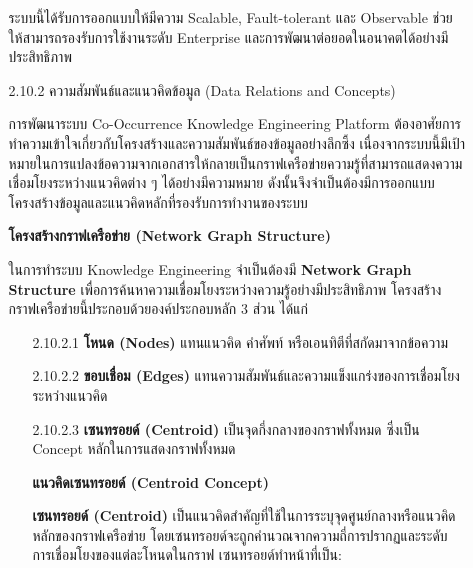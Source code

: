 \documentclass[12pt,a4paper]{article}
\newcommand{\textlight}[1]{{\thailightfont #1}}
\begin{document}
\begin{enumerate}[leftmargin=2cm]
\begin{enumerate}
{            \hspace{1cm}ระบบนี้ได้รับการออกแบบให้มีความ Scalable, Fault-tolerant และ Observable ช่วยให้สามารถรองรับการใช้งานระดับ Enterprise และการพัฒนาต่อยอดในอนาคตได้อย่างมีประสิทธิภาพ
        }

        \item[2.10.2] ความสัมพันธ์และแนวคิดข้อมูล (Data Relations and Concepts)
        \\
        \textlight{
            \hspace{1cm}การพัฒนาระบบ Co-Occurrence Knowledge Engineering Platform ต้องอาศัยการทำความเข้าใจเกี่ยวกับโครงสร้างและความสัมพันธ์ของข้อมูลอย่างลึกซึ้ง เนื่องจากระบบนี้มีเป้าหมายในการแปลงข้อความจากเอกสารให้กลายเป็นกราฟเครือข่ายความรู้ที่สามารถแสดงความเชื่อมโยงระหว่างแนวคิดต่าง ๆ ได้อย่างมีความหมาย ดังนั้นจึงจำเป็นต้องมีการออกแบบโครงสร้างข้อมูลและแนวคิดหลักที่รองรับการทำงานของระบบ

            \vspace{0.5cm}

            \textbf{โครงสร้างกราฟเครือข่าย (Network Graph Structure)}

            \hspace{1cm}ในการทำระบบ Knowledge Engineering จำเป็นต้องมี \textbf{Network Graph Structure} เพื่อการค้นหาความเชื่อมโยงระหว่างความรู้อย่างมีประสิทธิภาพ โครงสร้างกราฟเครือข่ายนี้ประกอบด้วยองค์ประกอบหลัก 3 ส่วน ได้แก่

            \begin{enumerate}
                \item[2.10.2.1] \textbf{โหนด (Nodes)} แทนแนวคิด คำศัพท์ หรือเอนทิตีที่สกัดมาจากข้อความ
                \item[2.10.2.2] \textbf{ขอบเชื่อม (Edges)} แทนความสัมพันธ์และความแข็งแกร่งของการเชื่อมโยงระหว่างแนวคิด
                \item[2.10.2.3] \textbf{เซนทรอยด์ (Centroid)} เป็นจุดกึ่งกลางของกราฟทั้งหมด ซึ่งเป็น Concept หลักในการแสดงกราฟทั้งหมด
                
                \vspace{0.3cm}

            \textbf{แนวคิดเซนทรอยด์ (Centroid Concept)}

            \hspace{1cm}\textbf{เซนทรอยด์ (Centroid)} เป็นแนวคิดสำคัญที่ใช้ในการระบุจุดศูนย์กลางหรือแนวคิดหลักของกราฟเครือข่าย โดยเซนทรอยด์จะถูกคำนวณจากความถี่การปรากฏและระดับการเชื่อมโยงของแต่ละโหนดในกราฟ เซนทรอยด์ทำหน้าที่เป็น:


\end{enumerate}}
\end{enumerate}
\end{enumerate}
\end{document}
